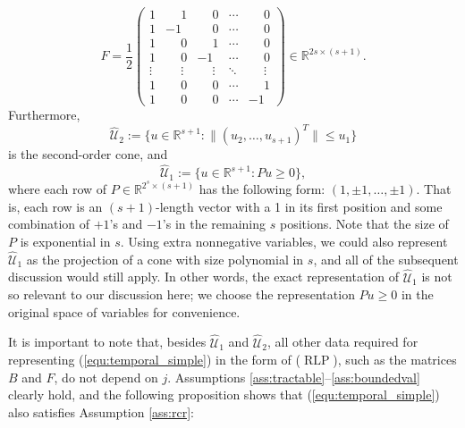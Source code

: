 \documentclass[12pt]{article}
\DeclareMathOperator{\AR}{RLP}
\newcommand{\K}{\widehat{\mathcal{U}}}
\def\RR{{\mathbb{R}}}
\begin{document}
\begin{onehalfspace}
\[       %
F = \frac12 \begin{pmatrix}
1 &  \phantom{-}1 &  \phantom{-}0 & \cdots &  \phantom{-}0 \\
1 & -1 &  \phantom{-}0 & \cdots &  \phantom{-}0 \\
1 &  \phantom{-}0 &  \phantom{-}1 & \cdots &  \phantom{-}0 \\
1 &  \phantom{-}0 & -1 & \cdots &  \phantom{-}0 \\
\vdots &  \phantom{-}\vdots &  \phantom{-}\vdots & \ddots &  \phantom{-}\vdots \\
1 &  \phantom{-}0 &  \phantom{-}0 & \cdots &  \phantom{-}1 \\
1 &  \phantom{-}0 &  \phantom{-}0 & \cdots & -1 
\end{pmatrix} \in \RR^{2s \times (s+1)}.
\]
Furthermore,
\[
    \K_2 := \{ u \in \RR^{s+1} : \| (u_2,\ldots,u_{s+1})^T \| \le u_1 \}
\]
is the second-order cone, and
\[
    \K_1 := \{ u \in \RR^{s+1} : P u \ge 0 \},
\]
where each row of $P \in \RR^{2^{s} \times (s+1)}$ has the following form:
$(1, \pm 1, \ldots, \pm 1)$. That is, each row is an $(s+1)$-length
vector with a 1 in its first position and some combination of $+1$'s
and $-1$'s in the remaining $s$ positions. Note that the size of $P$ is
exponential in $s$. Using extra nonnegative variables, we could also
represent $\K_1$ as the projection of a cone with size
polynomial in $s$, and all of the subsequent discussion would
still apply. In other words, the exact representation of $\K_1$ is not
so relevant to our discussion here; we choose the representation
$Pu \ge 0$ in the original space of variables for convenience.

It is important to note that, besides $\K_1$ and $\K_2$, all
other data required for representing (\ref{equ:temporal_simple}) in the form of
($\AR$), such as the matrices $B$ and $F$, do not depend on
$j$. Assumptions \ref{ass:tractable}--\ref{ass:boundedval} clearly hold,
and the following proposition shows that (\ref{equ:temporal_simple})
also satisfies Assumption \ref{ass:rcr}:


\end{onehalfspace}
\end{document}
